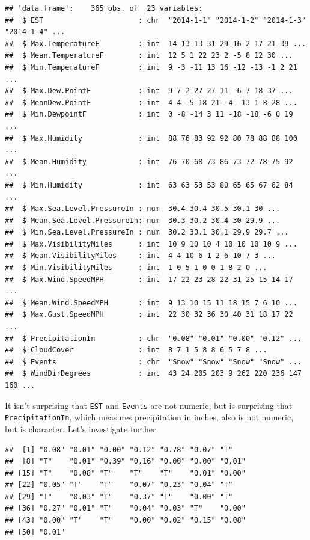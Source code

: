 \documentclass[
]{krantz}
\newenvironment{Shaded}{\begin{snugshade}}{\end{snugshade}}
\newcommand{\DecValTok}[1]{\textcolor[rgb]{0.00,0.00,0.81}{#1}}
\newcommand{\NormalTok}[1]{#1}
\newcommand{\OperatorTok}[1]{\textcolor[rgb]{0.81,0.36,0.00}{\textbf{#1}}}
\begin{document}
\begin{verbatim}
## 'data.frame':    365 obs. of  23 variables:
##  $ EST                      : chr  "2014-1-1" "2014-1-2" "2014-1-3" "2014-1-4" ...
##  $ Max.TemperatureF         : int  14 13 13 31 29 16 2 17 21 39 ...
##  $ Mean.TemperatureF        : int  12 5 1 22 23 2 -5 8 12 30 ...
##  $ Min.TemperatureF         : int  9 -3 -11 13 16 -12 -13 -1 2 21 ...
##  $ Max.Dew.PointF           : int  9 7 2 27 27 11 -6 7 18 37 ...
##  $ MeanDew.PointF           : int  4 4 -5 18 21 -4 -13 1 8 28 ...
##  $ Min.DewpointF            : int  0 -8 -14 3 11 -18 -18 -6 0 19 ...
##  $ Max.Humidity             : int  88 76 83 92 92 80 78 88 88 100 ...
##  $ Mean.Humidity            : int  76 70 68 73 86 73 72 78 75 92 ...
##  $ Min.Humidity             : int  63 63 53 53 80 65 65 67 62 84 ...
##  $ Max.Sea.Level.PressureIn : num  30.4 30.4 30.5 30.1 30 ...
##  $ Mean.Sea.Level.PressureIn: num  30.3 30.2 30.4 30 29.9 ...
##  $ Min.Sea.Level.PressureIn : num  30.2 30.1 30.1 29.9 29.7 ...
##  $ Max.VisibilityMiles      : int  10 9 10 10 4 10 10 10 10 9 ...
##  $ Mean.VisibilityMiles     : int  4 4 10 6 1 2 6 10 7 3 ...
##  $ Min.VisibilityMiles      : int  1 0 5 1 0 0 1 8 2 0 ...
##  $ Max.Wind.SpeedMPH        : int  17 22 23 28 22 31 25 15 14 17 ...
##  $ Mean.Wind.SpeedMPH       : int  9 13 10 15 11 18 15 7 6 10 ...
##  $ Max.Gust.SpeedMPH        : int  22 30 32 36 30 40 31 18 17 22 ...
##  $ PrecipitationIn          : chr  "0.08" "0.01" "0.00" "0.12" ...
##  $ CloudCover               : int  8 7 1 5 8 8 6 5 7 8 ...
##  $ Events                   : chr  "Snow" "Snow" "Snow" "Snow" ...
##  $ WindDirDegrees           : int  43 24 205 203 9 262 220 236 147 160 ...
\end{verbatim}

It isn't surprising that \texttt{EST} and \texttt{Events} are not numeric, but is surprising that \texttt{PrecipitationIn}, which measures precipitation in inches, also is not numeric, but is character. Let's investigate further.

\begin{Shaded}
\end{Shaded}

\begin{verbatim}
##  [1] "0.08" "0.01" "0.00" "0.12" "0.78" "0.07" "T"   
##  [8] "T"    "0.01" "0.39" "0.16" "0.00" "0.00" "0.01"
## [15] "T"    "0.08" "T"    "T"    "T"    "0.01" "0.00"
## [22] "0.05" "T"    "T"    "0.07" "0.23" "0.04" "T"   
## [29] "T"    "0.03" "T"    "0.37" "T"    "0.00" "T"   
## [36] "0.27" "0.01" "T"    "0.04" "0.03" "T"    "0.00"
## [43] "0.00" "T"    "T"    "0.00" "0.02" "0.15" "0.08"
## [50] "0.01"
\end{verbatim}
\end{document}
